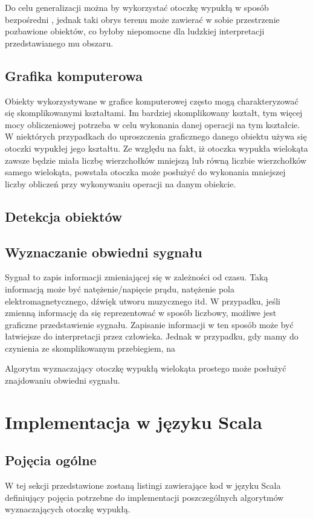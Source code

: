         Do celu generalizacji można by wykorzystać otoczkę wypukłą w sposób bezpośredni \cite{LAURINI2017139}, jednak taki obrys terenu może zawierać w sobie przestrzenie pozbawione obiektów, co byłoby niepomocne dla ludzkiej interpretacji przedstawianego mu obszaru. 
		\section{Grafika komputerowa}
		Obiekty wykorzystywane w grafice komputerowej często mogą charakteryzować się skomplikowanymi kształtami. Im bardziej skomplikowany kształt, tym więcej mocy obliczeniowej potrzeba w celu wykonania danej operacji na tym kształcie. W niektórych przypadkach do uproszczenia graficznego danego obiektu używa się otoczki wypukłej jego kształtu. Ze względu na fakt, iż otoczka wypukła wielokąta zawsze będzie miała liczbę wierzchołków mniejszą lub równą liczbie wierzchołków samego wielokąta, powstała otoczka może posłużyć do wykonania mniejszej liczby obliczeń przy wykonywaniu operacji na danym obiekcie.
		\section{Detekcja obiektów}
        \section{Wyznaczanie obwiedni sygnału}
        Sygnał to zapis informacji zmieniającej się w zależności od czasu. Taką informacją może być natężenie/napięcie prądu, natężenie pola elektromagnetycznego, dźwięk utworu muzycznego itd. W przypadku, jeśli zmienną informację da się  reprezentować w sposób liczbowy, możliwe jest graficzne przedstawienie sygnału. Zapisanie informacji w ten sposób może być łatwiejsze do interpretacji przez człowieka. Jednak w przypadku, gdy mamy do czynienia ze skomplikowanym przebiegiem, na
        
        Algorytm wyznaczający otoczkę wypukłą wielokąta prostego może posłużyć znajdowaniu obwiedni sygnału.
        
   \chapter{Implementacja w języku Scala}
   		\section{Pojęcia ogólne}
   		W tej sekcji przedstawione zostaną listingi zawierające kod w języku Scala definiujący pojęcia potrzebne do implementacji poszczególnych algorytmów wyznaczających otoczkę wypukłą.
   		
